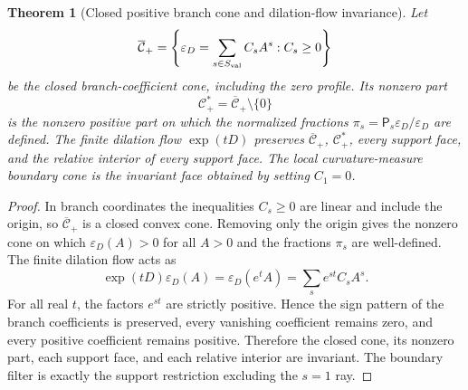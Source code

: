 \documentclass[11pt,a4paper]{article}
\def\Dil{D}%
\numberwithin{equation}{section}
\theoremstyle{definition}
\theoremstyle{plain}
\newtheorem{theorem}[criterion]{Theorem}
\theoremstyle{remark}
\newcommand{\Dil}{\mathscr{D}}
\newcommand{\epsD}{\varepsilon_D}
\begin{document}
\begin{theorem}[Closed positive branch cone and dilation-flow invariance]
Let
\begin{equation}
\overline{\mathcal C}_+=\left\{\epsD=\sum_{s\in S_{\rm val}}C_sA^s:
C_s\ge0\right\}
\end{equation}
be the closed branch-coefficient cone, including the zero profile.  Its nonzero
part
\begin{equation}
\mathcal C_+^\ast=\overline{\mathcal C}_+\setminus\{0\}
\end{equation}
is the nonzero positive part on which the normalized fractions
\(\pi_s=\mathsf P_s\epsD/\epsD\) are defined.  The finite dilation flow
\(\exp(t\Dil)\) preserves \(\overline{\mathcal C}_+\), \(\mathcal C_+^\ast\),
every support face, and the relative interior of every support face.  The local
curvature-measure boundary cone is the invariant face obtained by setting
\(C_1=0\).
\end{theorem}
\begin{proof}
In branch coordinates the inequalities \(C_s\ge0\) are linear and include the
origin, so \(\overline{\mathcal C}_+\) is a closed convex cone.  Removing only the
origin gives the nonzero cone on which \(\epsD(A)>0\) for all \(A>0\) and the
fractions \(\pi_s\) are well-defined.  The finite dilation flow acts as
\begin{equation}
\exp(t\Dil)\epsD(A)=\epsD(e^tA)=\sum_s e^{st}C_sA^s.
\end{equation}
For all real \(t\), the factors \(e^{st}\) are strictly positive.  Hence the sign
pattern of the branch coefficients is preserved, every vanishing coefficient
remains zero, and every positive coefficient remains positive.  Therefore the
closed cone, its nonzero part, each support face, and each relative interior are
invariant.  The boundary filter is exactly the support restriction excluding the
\(s=1\) ray.
\end{proof}
\end{document}
